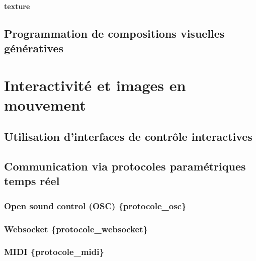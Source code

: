 \documentclass[
]{book}
\begin{document}
\hypertarget{texture-1}{%
\subsubsection{texture}\label{texture-1}}

\hypertarget{programmation-de-compositions-visuelles-guxe9nuxe9ratives}{%
\section{Programmation de compositions visuelles génératives}\label{programmation-de-compositions-visuelles-guxe9nuxe9ratives}}

\hypertarget{interagir}{%
\chapter{Interactivité et images en mouvement}\label{interagir}}

\hypertarget{interagir_interfaces}{%
\section{Utilisation d'interfaces de contrôle interactives}\label{interagir_interfaces}}

\hypertarget{interagir_protocoles}{%
\section{Communication via protocoles paramétriques temps réel}\label{interagir_protocoles}}

\hypertarget{open-sound-control-osc-protocole_osc}{%
\subsection{Open sound control (OSC) \{protocole\_osc\}}\label{open-sound-control-osc-protocole_osc}}

\hypertarget{websocket-protocole_websocket}{%
\subsection{Websocket \{protocole\_websocket\}}\label{websocket-protocole_websocket}}

\hypertarget{midi-protocole_midi}{%
\subsection{MIDI \{protocole\_midi\}}\label{midi-protocole_midi}}
\end{document}
